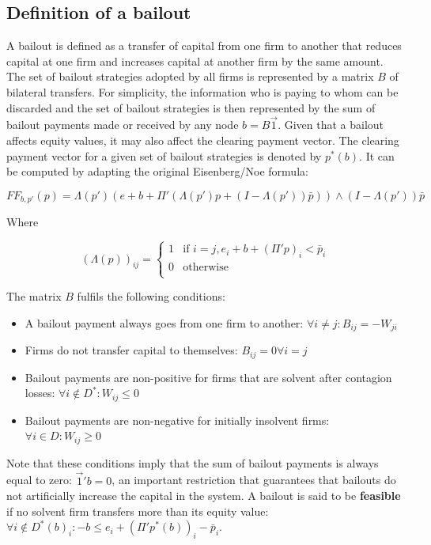\documentclass[12pt,a4paper]{article}
\begin{document}
\subsection{Definition of a bailout}
A bailout is defined as a transfer of capital from one firm to another that reduces capital at one firm and increases capital at another firm by the same amount. The set of bailout strategies adopted by all firms is represented by a matrix $B$ of bilateral transfers. For simplicity, the information who is paying to whom can be discarded and the set of bailout strategies is then represented by the sum of bailout payments made or received by any node $b=B\vec{1}$. Given that a bailout affects equity values, it may also affect the clearing payment vector. The clearing payment vector for a given set of bailout strategies is denoted by $p^*(b)$. It can be computed by adapting the original Eisenberg/Noe formula:

\[
FF_{b,p'}(p)=\Lambda (p')(e+b+\Pi'(\Lambda (p')p+(I-\Lambda (p'))\bar{p})) \wedge (I-\Lambda (p'))\bar{p}
\]

Where 

\[
(\Lambda (p))_{ij}= \begin{cases}
1 & \mbox{if }i=j,e_{i}+b+(\Pi 'p)_{i}<\bar{p}_{i} \\
0 & \mbox{otherwise} \\
\end{cases}
\]

The matrix $B$ fulfils the following conditions:

\begin{itemize}
\item A bailout payment always goes from one firm to another: $\forall i\ne j \colon B_{ij}=-W_{ji} $
\item Firms do not transfer capital to themselves: $B_{ij}=0 \forall i=j$
\item Bailout payments are non-positive for firms that are solvent after contagion losses: $\forall i \notin D^{*} \colon W_{ij}\le 0$
\item Bailout payments are non-negative for initially insolvent firms: $\forall i \in D \colon W_{ij} \ge 0$
\end{itemize}

Note that these conditions imply that the sum of bailout payments is always equal to zero: $\vec{1}'b=0$, an important restriction that guarantees that bailouts do not artificially increase the capital in the system. A bailout is said to be \textbf{feasible} if no solvent firm transfers more than its equity value: $\forall i\notin D^* (b)_i \colon -b \le e_i+(\Pi' p^* (b))_i-\bar{p}_i$.
\end{document}
